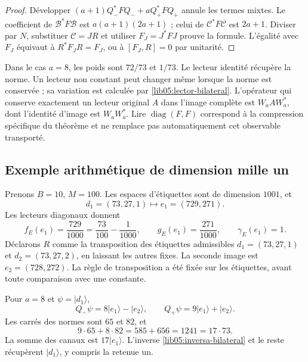 \begin{proof}
Développer \((a+1)Q_-^*FQ_-+aQ_+^*FQ_+\) annule les
termes mixtes. Le coefficient de \(\mathcal B^*F\mathcal B\)
est \(a(a+1)(2a+1)\) ; celui de
\(\mathcal C^*F\mathcal C\) est \(2a+1\). Diviser par
\(N\), substituer \(\mathcal C=JR\) et utiliser
\(F_J=J^*FJ\) prouve la formule. L’égalité avec \(F_J\)
équivaut à \(R^*F_JR=F_J\), ou à \([F_J,R]=0\) par
unitarité.
\end{proof}

Dans le cas \(a=8\), les poids sont \(72/73\) et \(1/73\). Le lecteur identité récupère la norme. Un lecteur non constant peut changer même lorsque la norme est conservée ; sa variation est calculée par \eqref{lib05:lector-bilateral}. L'opérateur qui conserve exactement un lecteur original \(A\) dans l'image complète est \(W_aAW_a^*\), dont l'identité d'image est \(W_aW_a^*\). Lire \(\operatorname{diag}(F,F)\) correspond à la compression spécifique du théorème et ne remplace pas automatiquement cet observable transporté.

\subsection{Exemple arithmétique de dimension mille un}
\label{lib05:ejemplo}

Prenons \(B=10\), \(M=100\). Les espaces d’étiquettes sont de
dimension \(1001\), et
\begin{equation}
 d_1=(73,27,1)\longmapsto e_1=(729,271).
 \label{lib05:ejemplo-etiqueta}
\end{equation}
Les lecteurs diagonaux donnent
\begin{equation}
 f_E(e_1)=\frac{729}{1000}
 =\frac{73}{100}-\frac1{1000},\qquad
 g_E(e_1)=\frac{271}{1000},\qquad \gamma_E(e_1)=1.
 \label{lib05:ejemplo-lectores}
\end{equation}
Déclarons \(R\) comme la transposition des étiquettes
admissibles \(d_1=(73,27,1)\) et \(d_2=(73,27,2)\), en laissant
les autres fixes. La seconde image est \(e_2=(728,272)\).
La règle de transposition a été fixée sur les étiquettes, avant
toute comparaison avec une constante.

Pour \(a=8\) et \(\psi=|d_1\rangle\),
\begin{equation}
 Q_-\psi=8|e_1\rangle-|e_2\rangle,\qquad
 Q_+\psi=9|e_1\rangle+|e_2\rangle.
 \label{lib05:ejemplo-canales}
\end{equation}
Les carrés des normes sont \(65\) et \(82\), et
\begin{equation}
 9\cdot65+8\cdot82=585+656=1241=17\cdot73.
 \label{lib05:ejemplo-balance}
\end{equation}
La somme des canaux est \(17|e_1\rangle\). L’inverse
\eqref{lib05:inversa-bilateral} et le reste récupèrent
\(|d_1\rangle\), y compris la retenue un.


